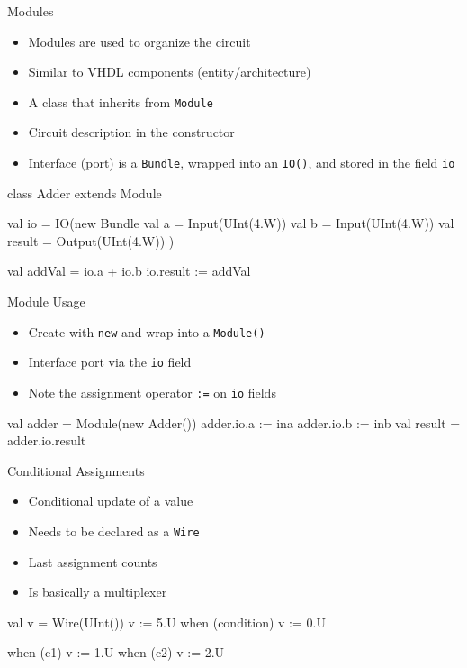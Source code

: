 \documentclass[xcolor=pdflatex,dvipsnames,table]{beamer}
\newcommand{\code}[1]{{\texttt{#1}}}
\begin{document}
\begin{frame}[fragile]{Modules}
\begin{itemize}
\item Modules are used to organize the circuit
\item Similar to VHDL components (entity/architecture)
\item A class that inherits from \code{Module}
\item Circuit description in the constructor
\item Interface (port) is a \code{Bundle}, wrapped into an \code{IO()}, and stored in the field \code{io}
\end{itemize}
\begin{chisel}
class Adder extends Module {
  val io = IO(new Bundle {
    val a = Input(UInt(4.W))
    val b = Input(UInt(4.W))
    val result = Output(UInt(4.W))
  })

  val addVal = io.a + io.b
  io.result := addVal
}
\end{chisel}
\end{frame}

\begin{frame}[fragile]{Module Usage}
\begin{itemize}
\item Create with \code{new} and wrap into a \code{Module()}
\item Interface port via the \code{io} field
\item Note the assignment operator \code{:=} on \code{io} fields
\end{itemize}
\begin{chisel}
  val adder = Module(new Adder())
  adder.io.a := ina
  adder.io.b := inb
  val result = adder.io.result
\end{chisel}
\end{frame}

\begin{frame}[fragile]{Conditional Assignments}
\begin{itemize}
\item Conditional update of a value
\item Needs to be declared as a \code{Wire}
\item Last assignment counts
\item Is basically a multiplexer
\end{itemize}
\begin{chisel}
  val v = Wire(UInt())
  v := 5.U
  when (condition) {
    v := 0.U
  }

  when (c1) { v := 1.U }
  when (c2) { v := 2.U }
\end{chisel}
\end{frame}
\end{document}
